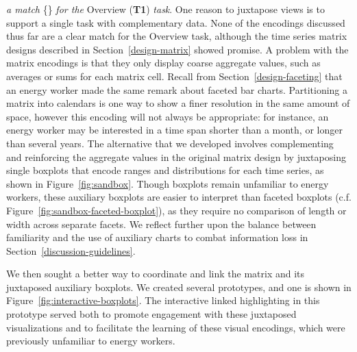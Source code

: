 \documentclass[journal]{vgtc}                %
\newcommand*\match{\textcolor{darkGreen}{\ding{52}}}
\newcommand{\bstart}[1]{\vspace{1mm} \noindent{\textbf{#1:}}}
\newcommand{\jn}[1]{\textcolor{darkGreen}{#1}}
\begin{document}
\bstart{Juxtaposed matrix and boxplots} {\it a match} \{\match\} {\it for the} Overview ({\bf T1}) {\it task}.
One reason to juxtapose views is to support a single task with complementary data.
None of the encodings discussed thus far are a clear match for the Overview task, although the time series matrix designs described in Section~\ref{design-matrix} showed promise.
A problem with the matrix encodings is that they only display coarse aggregate values, such as averages or sums for each matrix cell. 
Recall from Section~\ref{design-faceting} that an energy worker made the same remark about faceted bar charts.
Partitioning a matrix into calendars is one way to show a finer resolution in the same amount of space, however this encoding will not always be appropriate: for instance, an energy worker may be interested in a time span shorter than a month, or longer than several years.
The alternative that we developed involves complementing and reinforcing the aggregate values in the original matrix design by juxtaposing single boxplots that encode ranges and distributions for each time series, as shown in Figure~\ref{fig:sandbox}.
Though boxplots remain unfamiliar to energy workers, these auxiliary boxplots are easier to interpret than faceted boxplots (c.f. Figure~\ref{fig:sandbox-faceted-boxplot}), as they require no comparison of length or width across separate facets. 
We reflect further upon the balance between familiarity and the use of auxiliary charts to combat information loss in Section~\ref{discussion-guidelines}.

We then sought a better way to coordinate and link the matrix and its juxtaposed auxiliary boxplots. We created several prototypes, and one is shown in Figure~\ref{fig:interactive-boxplots}.
The interactive linked highlighting in this prototype served both to promote engagement with these juxtaposed visualizations and to facilitate the learning of these visual encodings, which were previously unfamiliar to energy workers.
\end{document}
